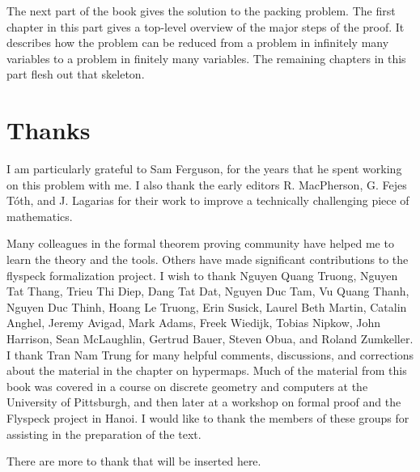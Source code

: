 The next part of the book gives the solution to the packing problem.
The first chapter in this part gives a top-level overview of the major
steps of the proof.  It describes how the problem can be reduced from
a problem in infinitely many variables to a problem in finitely many
variables.  The remaining chapters in this part flesh out that
skeleton.






\section{Thanks}

I am particularly grateful to Sam Ferguson, for the years that
he spent working on this problem with me.  I also thank the early editors
R. MacPherson, G. Fejes T\'oth, and J. Lagarias for their work
to improve a technically challenging piece of mathematics.  

Many colleagues in the formal theorem proving community have helped me
to learn the theory and the tools.  Others have made significant
contributions to the flyspeck formalization project.  I wish to thank
Nguyen Quang Truong, %
Nguyen Tat Thang, %
Trieu Thi Diep, Dang Tat Dat, Nguyen Duc Tam, Vu Quang Thanh, Nguyen
Duc Thinh, Hoang Le Truong, Erin Susick, Laurel Beth Martin, Catalin
Anghel, Jeremy Avigad, Mark Adams, Freek Wiedijk, Tobias Nipkow, John
Harrison, Sean McLaughlin, Gertrud Bauer, Steven Obua, and Roland
Zumkeller.  I thank Tran Nam Trung for many helpful comments,
discussions, and corrections about the material in the chapter on
hypermaps.  Much of the material from this book was covered in a
course on discrete geometry and computers at the University of
Pittsburgh, and then later at a workshop on formal proof and the
Flyspeck project in Hanoi.  I would like to thank the members of these
groups for assisting in the preparation of the text.



\begin{note}%
There are more to thank that will be inserted here.
\end{note}

